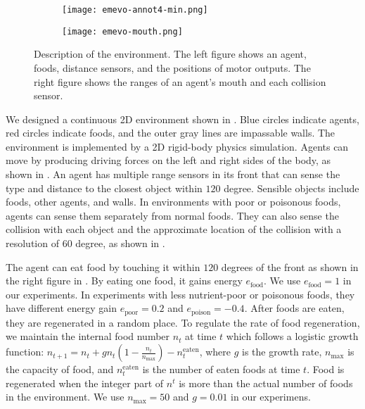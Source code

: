 \begin{figure}[t]
  \begin{subfigure}[t]{4.5cm}
    \centering
    \texttt{[image: emevo-annot4-min.png]}
  \end{subfigure}
  \begin{subfigure}[t]{3.5cm}
    \centering
    \texttt{[image: emevo-mouth.png]}
  \end{subfigure}
  \caption{
    Description of the environment.
    The left figure shows an agent, foods, distance sensors, and the positions of motor outputs.
    The right figure shows the ranges of an agent's mouth and each collision sensor.
  }\label{figure:env-discr}
\end{figure}

We designed a continuous 2D environment shown in . Blue circles indicate agents, red circles indicate foods, and the outer gray lines are impassable walls. The environment is implemented by a 2D rigid-body physics simulation. Agents can move by producing driving forces on the left and right sides of the body, as shown in . An agent has multiple range sensors in its front that can sense the type and distance to the closest object within $120$ degree. Sensible objects include foods, other agents, and walls. In environments with poor or poisonous foods, agents can sense them separately from normal foods. They can also sense the collision with each object and the approximate location of the collision with a resolution of $60$ degree, as shown in .

The agent can eat food by touching it within $120$ degrees of the front as shown in the right figure in . By eating one food, it gains energy $e_{\mathrm{food}}$. We use $e_{\mathrm{food}} = 1$ in our experiments. In experiments with less nutrient-poor or poisonous foods, they have different energy gain $e_{\mathrm{poor}} = 0.2$ and $e_{\mathrm{poison}} = -0.4$. After foods are eaten, they are regenerated in a random place. To regulate the rate of food regeneration, we maintain the internal food number $n_{t}$ at time $t$ which follows a logistic growth function: $n_{t + 1} = n_{t} + gn_{t}(1 - \frac{n_{t}}{n_{\mathrm{max}}}) - n_{t}^{\mathrm{eaten}}$, where $g$ is the growth rate, $n_{\mathrm{max}}$ is the capacity of food, and $n_{t}^{\mathrm{eaten}}$ is the number of eaten foods at time $t$. Food is regenerated when the integer part of $n^{t}$ is more than the actual number of foods in the environment. We use $n_{\mathrm{max}} = 50$ and $g = 0.01$ in our experimens.

